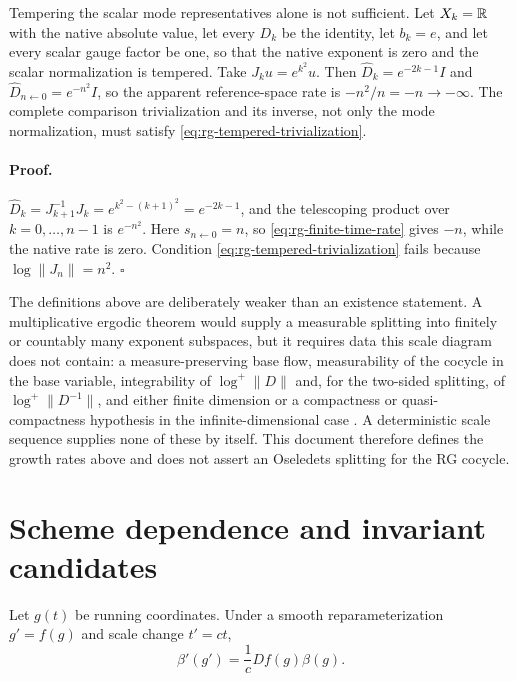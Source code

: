 Tempering the scalar mode representatives alone is not sufficient. Let
\(X_k=\mathbb R\) with the native absolute value, let every \(D_k\) be the identity, let
\(b_k=e\), and let every scalar gauge factor be one, so that the native exponent
is zero and the scalar normalization is tempered. Take
\(J_ku=e^{k^2}u\). Then \(\widehat D_k=e^{-2k-1}I\) and
\(\widehat D_{n\leftarrow0}=e^{-n^2}I\), so the apparent reference-space rate is
\(-n^2/n=-n\to-\infty\). The complete comparison trivialization and its inverse,
not only the mode normalization, must satisfy
\eqref{eq:rg-tempered-trivialization}. 

\paragraph{Proof.}
\(\widehat D_k=J_{k+1}^{-1}J_k=e^{k^2-(k+1)^2}=e^{-2k-1}\), and the telescoping
product over \(k=0,\dots,n-1\) is \(e^{-n^2}\). Here
\(s_{n\leftarrow0}=n\), so \eqref{eq:rg-finite-time-rate} gives \(-n\), while
the native rate is zero. Condition
\eqref{eq:rg-tempered-trivialization} fails because
\(\log\lVert J_n\rVert=n^2\). \(\square\)

The definitions above are deliberately weaker than an existence statement. A
multiplicative ergodic theorem would supply a measurable splitting into
finitely or countably many exponent subspaces, but it requires data this scale
diagram does not contain: a measure-preserving base flow, measurability of the
cocycle in the base variable, integrability of \(\log^+\lVert D\rVert\) and, for
the two-sided splitting, of \(\log^+\lVert D^{-1}\rVert\), and either finite
dimension or a compactness or quasi-compactness hypothesis in the
infinite-dimensional case \citep{Arnold1998}. A deterministic scale sequence
supplies none of these by itself. This document therefore defines the growth
rates above and does not assert an Oseledets splitting for the RG cocycle.

\section{Scheme dependence and invariant candidates}
\label{sec:rg-scheme-dependence}

Let \(g(t)\) be running coordinates. Under a smooth reparameterization
\(g'=f(g)\) and scale change \(t'=ct\),
\begin{equation}
\beta'(g')=\frac1cDf(g)\beta(g).
\label{eq:rg-beta-change}
\end{equation}


